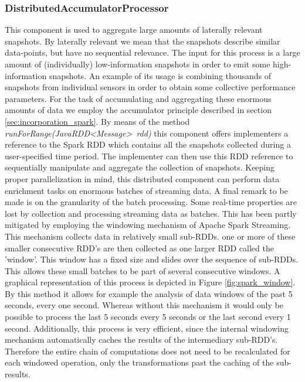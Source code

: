 \subsubsection{DistributedAccumulatorProcessor}
This component is used to aggregate large amounts of laterally relevant snapshots. By laterally relevant we mean that the snapshots describe similar data-points, but have no sequential relevance. The input for this process is a large amount of (individually) low-information snapshots in order to emit some high-information snapshots. An example of its usage is combining thousands of snapshots from individual sensors in order to obtain some collective performance parameters. For the task of accumulating and aggregating these enormous amounts of data we employ the accumulator principle described in section \ref{sec:incorporation_spark}. By means of the method \emph{runForRange(JavaRDD\textless Message\textgreater\ rdd)} this component offers implementers a reference to the Spark RDD which contains all the snapshots collected during a user-specified time period. The implementer can then use this RDD reference to sequentially manipulate and aggregate the collection of snapshots. Keeping proper parallelization in mind, this distributed component can perform data enrichment tasks on enormous batches of streaming data.
A final remark to be made is on the granularity of the batch processing. Some real-time properties are lost by collection and processing streaming data as batches. This has been partly mitigated by employing the windowing mechanism of Apache Spark Streaming. This mechanism collects data in relatively small sub-RDDs. one or more of these smaller consecutive RDD's are then collected as one larger RDD called the 'window'. This window has a fixed size and slides over the sequence of sub-RDDs. This allows these small batches to be part of several consecutive windows. A graphical representation of this process is depicted in Figure \ref{fig:spark_window}. By this method it allows for example the analysis of data windows of the past 5 seconds, every one second. Whereas without this mechanism it would only be possible to process the last 5 seconds every 5 seconds or the last second every 1 second. Additionally, this process is very efficient, since the internal windowing mechanism automatically caches the results of the intermediary sub-RDD's. Therefore the entire chain of computations does not need to be recalculated for each windowed operation, only the transformations past the caching of the sub-results.

